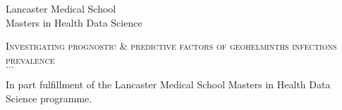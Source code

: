 
\begin{titlepage}

        \begin{center}

            \vspace*{1cm}

            \begin{minipage}{1.25\textwidth}

                \begin{center}

                    {\sffamily Lancaster Medical School\\Masters in Health Data Science}

                    \vspace{3.5cm}


                    \textsc{\Large{Investigating prognostic \& predictive factors of geohelminths infections prevalence\\
                        $\ldots$}}

                    \vspace{9.5cm}

                    In part fulfillment of the Lancaster Medical School Masters in Health Data Science programme.

                \end{center}



            \end{minipage}

        \end{center}

\end{titlepage}